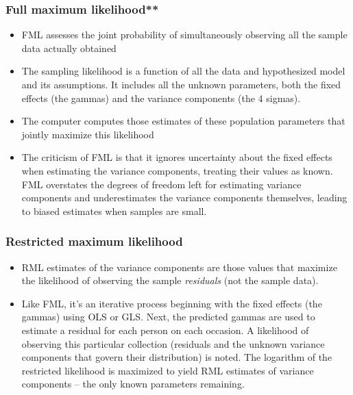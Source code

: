 \documentclass[
  11pt,
]{book}
\providecommand{\tightlist}{%
  \setlength{\itemsep}{0pt}\setlength{\parskip}{0pt}}
\begin{document}
\hypertarget{full-maximum-likelihood}{%
\subsubsection{Full maximum likelihood**}\label{full-maximum-likelihood}}

\begin{itemize}
\tightlist
\item
  FML assesses the joint probability of simultaneously observing all the sample data actually obtained
\item
  The sampling likelihood is a function of all the data and hypothesized model and its assumptions. It includes all the unknown parameters, both the fixed effects (the gammas) and the variance components (the 4 sigmas).
\item
  The computer computes those estimates of these population parameters that jointly maximize this likelihood
\item
  The criticism of FML is that it ignores uncertainty about the fixed effects when estimating the variance components, treating their values as known. FML overstates the degrees of freedom left for estimating variance components and underestimates the variance components themselves, leading to biased estimates when samples are small.
\end{itemize}

\hypertarget{restricted-maximum-likelihood}{%
\subsubsection{Restricted maximum likelihood}\label{restricted-maximum-likelihood}}

\begin{itemize}
\tightlist
\item
  RML estimates of the variance components are those values that maximize the likelihood of observing the sample \emph{residuals} (not the sample data).
\item
  Like FML, it's an iterative process beginning with the fixed effects (the gammas) using OLS or GLS. Next, the predicted gammas are used to estimate a residual for each person on each occasion. A likelihood of observing this particular collection (residuals and the unknown variance components that govern their distribution) is noted. The logarithm of the restricted likelihood is maximized to yield RML estimates of variance components -- the only known parameters remaining.
\end{itemize}
\end{document}
